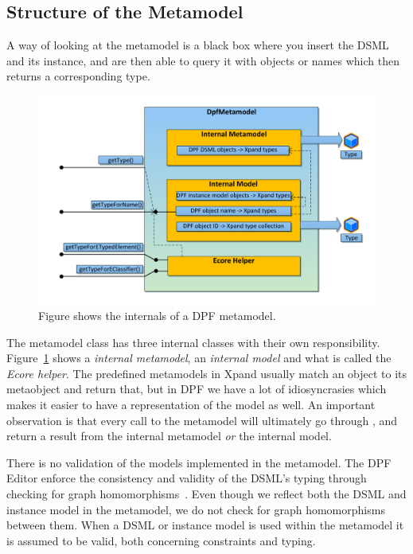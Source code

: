 \subsection{Structure of the Metamodel}
A way of looking at the metamodel is a black box where you insert the DSML and its instance, and are then able to query it with objects or names which then returns a corresponding type.

\begin{figure}[htpb]
  \centering
  \centerline{\includegraphics[scale=0.8]{images/metamodelcomponent.pdf}}
  \caption[View of the structure of the metamodel]{Figure shows the internals of a DPF metamodel.}
  \label{fig:metamodel_component}
\end{figure}

The metamodel class has three internal classes with their own responsibility. Figure~\ref{fig:metamodel_component} shows a \emph{internal metamodel}, an \emph{internal model} and what is called the \emph{Ecore helper}. The predefined metamodels in Xpand usually match an object to its metaobject and return that, but in DPF we have a lot of idiosyncrasies which makes it easier to have a representation of the model as well. An important observation is that every call to the metamodel will ultimately go through , and return a result from the internal metamodel \emph{or} the internal model.

There is no validation of the models implemented in the metamodel. The DPF Editor enforce the consistency and validity of the DSML's typing through checking for graph homomorphisms~\cite{Bech11}. Even though we reflect both the DSML and instance model in the metamodel, we do not check for graph homomorphisms between them. When a DSML or instance model is used within the metamodel it is assumed to be valid, both concerning constraints and typing.

